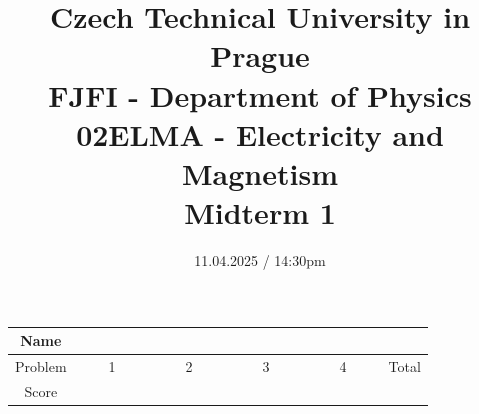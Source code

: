 \documentclass[a4paper,12pt]{article}
\title{{\large Czech Technical University in Prague} \\
    {\Large FJFI - Department of Physics} \\ 
                  02ELMA - Electricity and Magnetism \\ 
          {\Large \textbf{Midterm 1}}\vspace{-1cm}}
\date{11.04.2025 / 14:30pm}
\author{}
\begin{document}
\maketitle
\vspace{-1.5em}

\begin{center}
    \renewcommand{\arraystretch}{2}
    \begin{tabular}{ |c|c|c|c|c|c| } 
        \hline
        Name& \multicolumn{5}{c|}{\phantom{~~~~~~~~~~~~~~~~~~~~~~~~~~~~~~~~~~~~~~~~~~~~~~~~~~~~~~~~~~~~~~~~~~~~~~~~~~~~~~~~~}}\\
        \hline
        Problem & ~~~~1~~~~ & ~~~~2~~~~ & ~~~~3~~~~ & ~~~~4~~~~ & Total \\ 
        \hline
        Score & &  & & & \\
        \hline
    \end{tabular}
\end{center}

\vspace*{1cm}







\end{document}
